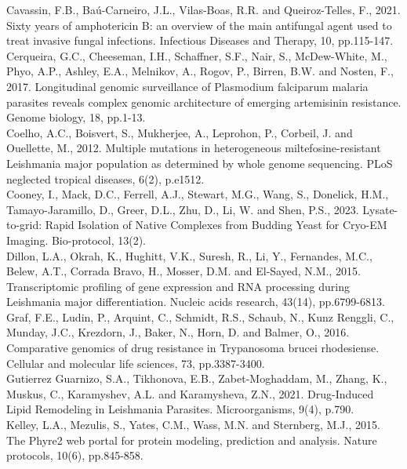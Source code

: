 \documentclass{bioinfo}
\begin{document}
Cavassin, F.B., Baú-Carneiro, J.L., Vilas-Boas, R.R. and Queiroz-Telles,
F., 2021. Sixty years of amphotericin B: an overview of the main
antifungal agent used to treat invasive fungal infections. Infectious
Diseases and Therapy, 10, pp.115-147.\\

Cerqueira, G.C., Cheeseman, I.H., Schaffner, S.F., Nair, S.,
McDew-White, M., Phyo, A.P., Ashley, E.A., Melnikov, A., Rogov, P.,
Birren, B.W. and Nosten, F., 2017. Longitudinal genomic surveillance of
Plasmodium falciparum malaria parasites reveals complex genomic
architecture of emerging artemisinin resistance. Genome biology, 18,
pp.1-13.\\

Coelho, A.C., Boisvert, S., Mukherjee, A., Leprohon, P., Corbeil, J. and
Ouellette, M., 2012. Multiple mutations in heterogeneous
miltefosine-resistant Leishmania major population as determined by whole
genome sequencing. PLoS neglected tropical diseases, 6(2), p.e1512.\\

Cooney, I., Mack, D.C., Ferrell, A.J., Stewart, M.G., Wang, S.,
Donelick, H.M., Tamayo-Jaramillo, D., Greer, D.L., Zhu, D., Li, W. and
Shen, P.S., 2023. Lysate-to-grid: Rapid Isolation of Native Complexes
from Budding Yeast for Cryo-EM Imaging. Bio-protocol, 13(2).\\

Dillon, L.A., Okrah, K., Hughitt, V.K., Suresh, R., Li, Y., Fernandes,
M.C., Belew, A.T., Corrada Bravo, H., Mosser, D.M. and El-Sayed, N.M.,
2015. Transcriptomic profiling of gene expression and RNA processing
during Leishmania major differentiation. Nucleic acids research, 43(14),
pp.6799-6813.\\

Graf, F.E., Ludin, P., Arquint, C., Schmidt, R.S., Schaub, N., Kunz
Renggli, C., Munday, J.C., Krezdorn, J., Baker, N., Horn, D. and Balmer,
O., 2016. Comparative genomics of drug resistance in Trypanosoma brucei
rhodesiense. Cellular and molecular life sciences, 73, pp.3387-3400.\\

Gutierrez Guarnizo, S.A., Tikhonova, E.B., Zabet-Moghaddam, M., Zhang,
K., Muskus, C., Karamyshev, A.L. and Karamysheva, Z.N., 2021.
Drug-Induced Lipid Remodeling in Leishmania Parasites. Microorganisms,
9(4), p.790.\\

Kelley, L.A., Mezulis, S., Yates, C.M., Wass, M.N. and Sternberg, M.J.,
2015. The Phyre2 web portal for protein modeling, prediction and
analysis. Nature protocols, 10(6), pp.845-858.\\
\end{document}

